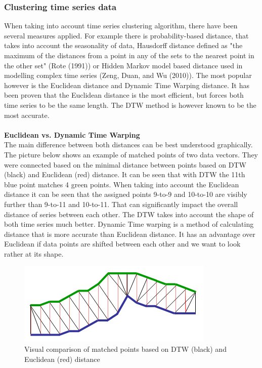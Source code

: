 \documentclass[11pt,a4paper]{article}
\begin{document}
\subsubsection{Clustering time series data}
When taking into account time series clustering algorithm, there have been
several measures applied. For example there is probability-based distance, that
takes into account the seasonality of data, Hausdorff distance defined as "the
maximum of the distances from a point in any of the sets to the nearest point in
the other set" (Rote (1991)) or Hidden Markov model based distance used in
modelling complex time series (Zeng, Duan, and Wu (2010)). The most popular
however is the Euclidean distance and Dynamic Time Warping distance. It has been
proven that the Euclidean distance is the most efficient, but forces both time
series to be the same length. The DTW method is however known to be the most
accurate.\\
\\
\textbf{Euclidean vs. Dynamic Time Warping}\\
The main difference between both distances can be best understood graphically.
The picture below shows an example of matched points of two data vectors. They
were connected based on the minimal distance between points based on DTW (black)
and Euclidean (red) distance. It can be seen that with DTW the 11th blue point
matches 4 green points. When taking into account the Euclidean distance it can
be seen that the assigned points 9-to-9 and 10-to-10 are visibly further than
9-to-11 and 10-to-11. That can significantly impact the overall distance of
series between each other. The DTW takes into account the shape of both time
series much better. Dynamic Time warping is a method of calculating distance
that is more accurate than Euclidean distance. It has an advantage over
Euclidean if data points are shifted between each other and we want to look
rather at its shape.
\begin{figure}[H]
    \begin{center}
        \hspace*{-0.3cm}
        \includegraphics[scale=1.1]{img/euclidean-dtw.png}
    \end{center}
    \vspace{-0.2cm}
    \caption{Visual comparison of matched points based on DTW (black) and Euclidean (red) distance}
\end{figure}
\end{document}
